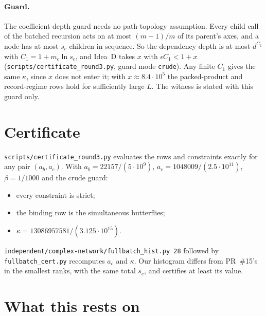 \documentclass[11pt]{article}
\theoremstyle{remark}\newtheorem*{remark}{Remark}
\begin{document}
\paragraph{Guard.} The coefficient-depth guard needs no path-topology assumption. Every child call of the
batched recursion acts on at most $(m-1)/m$ of its parent's axes, and a node has at most $s_c$ children in
sequence. So the dependency depth is at most $d^{C_1}$ with $C_1=1+m_c\ln s_c$, and Idea~D takes $x$ with
$\epsilon C_1<1+x$ (\texttt{scripts/certificate\_round3.py}, guard mode \texttt{crude}). Any finite $C_1$
gives the same $\kappa$, since $x$ does not enter it; with $x\approx8.4\cdot10^5$ the packed-product and
record-regime rows hold for sufficiently large $L$. The witness is stated with this guard only.

\section{Certificate}

\texttt{scripts/certificate\_round3.py} evaluates the rows and constraints exactly for any pair $(a_b,a_c)$.
With $a_b=22157/(5\cdot10^9)$, $a_c=1048009/(2.5\cdot10^{11})$, $\beta=1/1000$ and the crude guard:
\begin{itemize}
\item every constraint is strict;
\item the binding row is the simultaneous butterflies;
\item $\kappa=13086957581/(3.125\cdot10^{15})$.
\end{itemize}
\texttt{independent/complex-network/fullbatch\_hist.py 28} followed by \texttt{fullbatch\_cert.py}
recomputes $a_c$ and $\kappa$. Our histogram differs from PR~\#15's in the smallest ranks, with the same total
$s_c$, and certifies at least its value.

\section{What this rests on}
\end{document}
